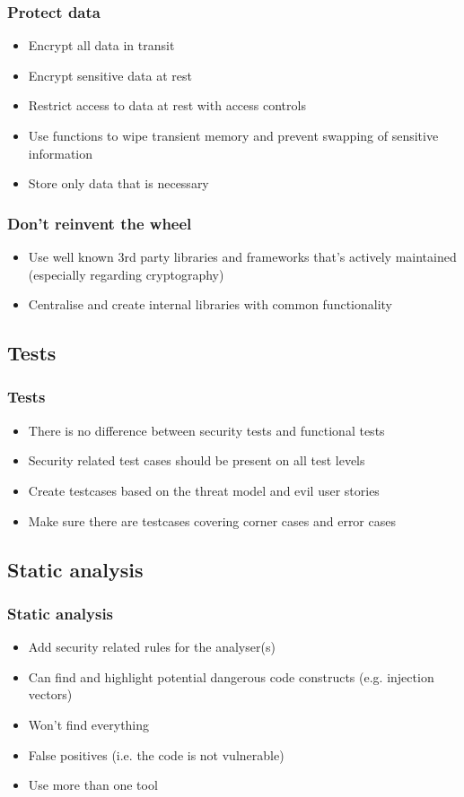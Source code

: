 \documentclass{beamer}
\begin{document}
    \begin{frame}
      \frametitle{Protect data}
      \begin{itemize}
        \item Encrypt all data in transit
        \item Encrypt sensitive data at rest
        \item Restrict access to data at rest with access controls
        \item Use functions to wipe transient memory and prevent swapping of sensitive information
        \item Store only data that is necessary
      \end{itemize}
    \end{frame}
    \begin{frame}
      \frametitle{Don't reinvent the wheel}
      \begin{itemize}
        \item Use well known 3rd party libraries and frameworks that's actively maintained (especially regarding cryptography)
        \item Centralise and create internal libraries with common functionality
      \end{itemize}
    \end{frame}
  \subsection{Tests}
    \begin{frame}
      \frametitle{Tests}
      \begin{itemize}
        \item There is no difference between security tests and functional tests
        \item Security related test cases should be present on all test levels
        \item Create testcases based on the threat model and evil user stories
        \item Make sure there are testcases covering corner cases and error cases
      \end{itemize}
    \end{frame}

  \subsection{Static analysis}
    \begin{frame}
      \frametitle{Static analysis}
      \begin{itemize}
        \item Add security related rules for the analyser(s)
        \item Can find and highlight potential dangerous code constructs (e.g. injection vectors)
        \item Won't find everything
        \item False positives (i.e. the code is not vulnerable)
        \item Use more than one tool
      \end{itemize}
    \end{frame}
\end{document}
